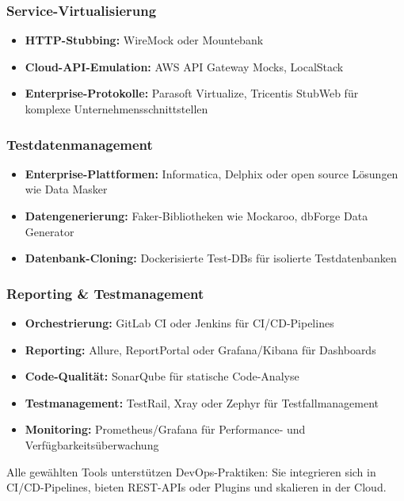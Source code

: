 \subsubsection{Service-Virtualisierung}
\begin{itemize}
    \item \textbf{HTTP-Stubbing:} WireMock oder Mountebank
    \item \textbf{Cloud-API-Emulation:} AWS API Gateway Mocks, LocalStack
    \item \textbf{Enterprise-Protokolle:} Parasoft Virtualize, Tricentis StubWeb für komplexe
    Unternehmensschnittstellen
\end{itemize}

\subsubsection{Testdatenmanagement}
\begin{itemize}
    \item \textbf{Enterprise-Plattformen:} Informatica, Delphix oder open source Lösungen wie
    Data Masker
    \item \textbf{Datengenerierung:} Faker-Bibliotheken wie Mockaroo, dbForge Data Generator
    \item \textbf{Datenbank-Cloning:} Dockerisierte Test-DBs für isolierte Testdatenbanken
\end{itemize}

\subsubsection{Reporting \& Testmanagement}
\begin{itemize}
    \item \textbf{Orchestrierung:} GitLab CI oder Jenkins für CI/CD-Pipelines
    \item \textbf{Reporting:} Allure, ReportPortal oder Grafana/Kibana für Dashboards
    \item \textbf{Code-Qualität:} SonarQube für statische Code-Analyse
    \item \textbf{Testmanagement:} TestRail, Xray oder Zephyr für Testfallmanagement
    \item \textbf{Monitoring:} Prometheus/Grafana für Performance- und Verfügbarkeitsüberwachung
\end{itemize}

Alle gewählten Tools unterstützen DevOps-Praktiken: Sie integrieren sich in CI/CD-Pipelines,
bieten REST-APIs oder Plugins und skalieren in der Cloud.

